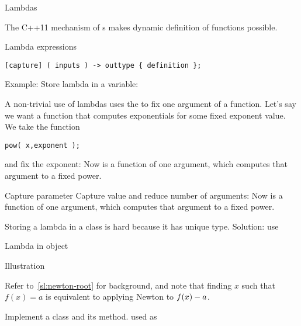  {Lambdas}
\label{sec:lambda}

The C++11 mechanism of s makes
dynamic definition of functions possible.

\begin{block}{Lambda expressions}
  \label{sl:lambda-syntax}
\begin{verbatim}
[capture] ( inputs ) -> outtype { definition };
\end{verbatim}
Example:
Store lambda in a variable:
\end{block}

A non-trivial use of lambdas uses the  to fix one argument of a
function.
Let's say we want a function that computes exponentials for some fixed
exponent value. We take the 
 function
\begin{verbatim}
pow( x,exponent );
\end{verbatim}
and fix the exponent:
%
%
Now  is a function of one argument, which computes
that argument to a fixed power.

\begin{slide}{Capture parameter}
  \label{sl:lambda-capture}
  Capture value and reduce number of arguments:
  Now  is a function of one argument, which computes
  that argument to a fixed power.
\end{slide}

Storing a lambda in a class is hard because it has unique
type. Solution: use 

\begin{block}{Lambda in object}
  \label{sl:lambda-class}
\end{block}

\begin{block}{Illustration}
  \label{sl:lambda-classed}
\end{block}

\begin{exercise}
  \label{ex:newtonlambda}
  Refer to~\ref{sl:newton-root} for background, and note that finding
  $x$ such that $f(x)=a$ is equivalent to applying Newton to
  $f(x)-\nobreak a$.

  Implement a class  and its  method.
  used as
\end{exercise}

